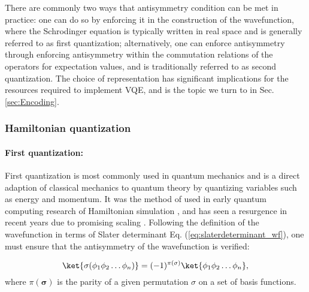 There are commonly two ways that antisymmetry condition can be met in practice: one can do so by enforcing it in the construction of the wavefunction, where the Schrodinger equation is typically written in real space and is generally referred to as first quantization; alternatively, one can enforce antisymmetry through enforcing antisymmetry within the commutation relations of the operators for expectation values, and is traditionally referred to as second quantization. The choice of representation has significant implications for the resources required to implement VQE, and is the topic we turn to in Sec. \ref{sec:Encoding}. 

\subsubsection{Hamiltonian quantization}

\paragraph{First quantization: } \label{sec:first_quantization}

First quantization is most commonly used in quantum mechanics and is a direct adaption of classical mechanics to quantum theory by quantizing variables such as energy and momentum. It was the method of used in early quantum computing research of Hamiltonian simulation  \cite{Lloyd1996, Abrams1997, Zalka1998, Boghosian1998, Lidar1999, Wiesner1996, Kassal2008}, and has seen a resurgence in recent years due to promising scaling \cite{Babbush2019, Su2021}.
Following the definition of the wavefunction in terms of Slater determinant Eq. (\ref{eq:slaterdeterminant_wf}), one must ensure that the antisymmetry of the wavefunction is verified:

\begin{equation}
    \ket{\mathbf{\sigma}(\phi_{1} \phi_{2} \ldots \phi_{n})} = (-1)^{\pi(\mathbf{\sigma})}\ket{\phi_{1} \phi_{2} \ldots \phi_{n}}, 
\end{equation}
where $\pi(\mathbf{\sigma})$ is the parity of a given permutation $\sigma$ on a set of basis functions.

